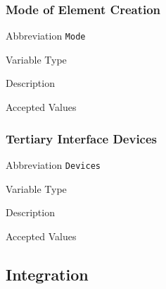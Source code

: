 \subsubsection{Mode of Element Creation}
\label{subsec:mode}

\begin{AlignedDesc}
  \item[Abbreviation] \texttt{Mode}

  \item[Variable Type]

  \item[Description]

  \item[Accepted Values]

  \begin{AlignedDesc}
    \item[\textellipsis]
  \end{AlignedDesc}

\end{AlignedDesc}

\subsubsection{Tertiary Interface Devices}
\label{subsec:devices}

\begin{AlignedDesc}
  \item[Abbreviation] \texttt{Devices}

  \item[Variable Type]

  \item[Description]

  \item[Accepted Values]

  \begin{AlignedDesc}
    \item[\textellipsis]
  \end{AlignedDesc}

\end{AlignedDesc}


\subsection{Integration}
\label{sec:integration}

